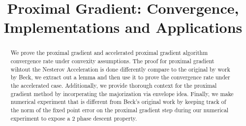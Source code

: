\documentclass[]{article}
\theoremstyle{definition}
\begin{document}
\title{Proximal Gradient: Convergence, Implementations and Applications}
\maketitle
\begin{abstract}
    We prove the proximal gradient and accelerated proximal gradient algorithm convergence rate under convexity assumptions. The proof for proximal gradient wihtout the Nesterov Acceleration is done differently compare to the original by work by Beck\cite{paper:FISTA}, we extract out a lemma and then use it to prove the convergence rate under the accelerated case. Additionally, we provide thorough context for the proximal gradient method by incorperating the majorization via envelope idea. Finally, we make numerical experiment that is different from Beck's original work by keeping track of the norm of the fixed point error on the proximal gradient step during our numerical experiment to expose a 2 phase descent property. 
\end{abstract}

\end{document}
